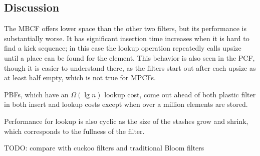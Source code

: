 \documentclass[letterpaper, 11pt]{article}
\begin{document}
\subsection{Discussion}

The MBCF offers lower space than the other two filters, but its performance is substantially worse.
It has significant insertion time increases when it is hard to find a kick sequence; in this case the lookup operation repeatedly calls upsize until a place can be found for the element.
This behavior is also seen in the PCF, though it is easier to understand there, as the filters start out after each upsize as at least half empty, which is not true for MPCFs.

PBFs, which have an $\Omega(\lg n)$ lookup cost, come out ahead of both plastic filter in both insert and lookup costs except when over a million elements are stored.

Performance for lookup is also cyclic as the size of the stashes grow and shrink, which corresponds to the fullness of the filter.

TODO: compare with cuckoo filters and traditional Bloom filters







\end{document}

